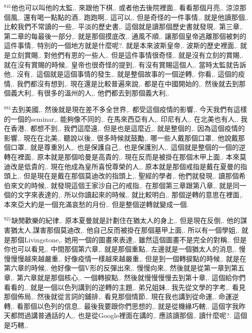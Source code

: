 \documentclass{book}
\begin{document}
$^{841}$他也可以叫他的太監,.
來跟他下棋,.
或者他去後院裡面,.
看看那個月亮,.
涼涼那個風,.
還有喝一點點的酒,.
跑跑啊,.
這可以,.
但是奇怪的一件事情,.
就是他讀那個,.
比較我們不常讀的一些,.
平淡的歷史書,.
這個就是讀那個歷史書就發現,.
第三章,.
第二章的每最後一部分,.
就是那個摸底改,.
通風不順,.
讓那個皇帝逃離那個被刺的這件事情,.
特別的一個地方就是什麼呢?.
就是本來波斯皇帝,.
波斯的歷史裡面,.
就是立刻賞賜,.
對他們有恩的一些人,.
但是這件事情很奇怪,.
就是沒有立刻的賞賜,.
就在沒有賞賜的時候,.
皇帝也很奇怪的提到,.
有沒有賞賜這個人,.
當時太監就告訴他,.
沒有,.
這個就是這個事情的發生,.
就是整個故事的一個逆轉,.
你看,.
這個的疫情,.
我們都沒有想到,.
現在還是比較普遍來說,.
都是在中國開始的,.
然後就去到那個義大利,.
有很多的溫州的人,.
他們都去到那個義大利,.

$^{881}$去到美國,.
然後就是現在差不多全世界,.
都受這個疫情的影響,.
今天我們有這樣的一個的seminar,.
能夠像不同的,.
在馬來西亞有人,.
印尼有人,.
在北美也有人,.
我在香港,.
都想不到,.
我們這麼遠,.
但是也是這麼近,.
就是整個的,.
因為這個疫情的影響,.
現在在北美,.
聽說以後,.
很多時候就鼓勵,.
哪一些人戴那個口罩,.
他說戴那個口罩,.
就是尊重別人,.
也是保護自己,.
也是保護別人,.
這個就是整個的一個的逆轉在裡面,.
原本就是那個哈曼是高貴的,.
現在反而是被掛在那個木甲上面,.
本來莫迪改是低貴的,.
現在他成為皇所喜悅尊榮的人,.
原本就是那個戒指是戴在夏曼的指頭上,.
但是現在是戴在那個莫迪改的指頭上,.
聖經的學者,.
他們就發現,.
讀那個希伯來文的時候,.
就發現這個王家沙自己的戒指,.
在那個第三章跟第八章,.
就是同一個的文字來表達的,.
所以你讀起來的時候,.
就比較明白,.
那個逆轉的意思在裡面,.
本來亞大約是一個充滿哀愁的月份,.
但是整個逆轉就變成一個.

$^{921}$缺閒歡樂的紀律,.
原本夏曼就是計劃住在猶太人的身上,.
但是現在反倒,.
他的謀害猶太人,謀害那個莫迪改,.
他自己反而被掛在那個墓甲上面,.
所以有一個學姐,.
就是那個Livingstone,.
她用一個的圖畫來表達,.
雖然這個圖畫不是完全的對稱,.
但是你也可以看見,.
中間那個第六章,.
就是那個重點,.
左邊就是一個猶太人的消息,.
慢慢慢慢越來越嚴重,.
好像疫情一樣越來越嚴重,.
但是到一個轉捩點的時候,.
就是在第六章的時候,.
他好像一個V形的反彈出來,.
慢慢向來,.
然後就是從第一章到第五章,.
第六章就是那個核心,.
一個轉捩點,.
然後就慢慢慢慢去到第十章,.
這個給你們看看的,.
就是一個以色列講到的逆轉的主題,.
弟兄姐妹,.
我先從文學的字考,.
看見那個佈局,.
然後就從言詞的鋪排,.
看見那個情節,.
現在我也講到從命運,.
命運逆轉,.
看那個以色列的信息,.
最後我要跟你們思想的,.
就是從機緣巧轄,.
這個字我昨天都問過講普通話的人,.
也是從Google裡面在講的,.
應該讀那個,.
讀什麼呢?.
這個是巧轄,.
\end{document}
